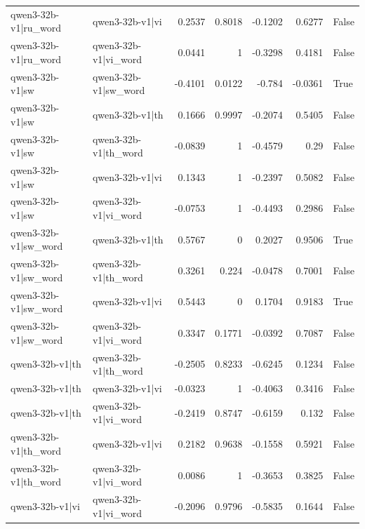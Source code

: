 \begin{table}
\begin{tabular}{l l r r r r l}
qwen3-32b-v1|ru_word & qwen3-32b-v1|vi & 0.2537 & 0.8018 & -0.1202 & 0.6277 & False \\
qwen3-32b-v1|ru_word & qwen3-32b-v1|vi_word & 0.0441 & 1 & -0.3298 & 0.4181 & False \\
qwen3-32b-v1|sw & qwen3-32b-v1|sw_word & -0.4101 & 0.0122 & -0.784 & -0.0361 & True \\
qwen3-32b-v1|sw & qwen3-32b-v1|th & 0.1666 & 0.9997 & -0.2074 & 0.5405 & False \\
qwen3-32b-v1|sw & qwen3-32b-v1|th_word & -0.0839 & 1 & -0.4579 & 0.29 & False \\
qwen3-32b-v1|sw & qwen3-32b-v1|vi & 0.1343 & 1 & -0.2397 & 0.5082 & False \\
qwen3-32b-v1|sw & qwen3-32b-v1|vi_word & -0.0753 & 1 & -0.4493 & 0.2986 & False \\
qwen3-32b-v1|sw_word & qwen3-32b-v1|th & 0.5767 & 0 & 0.2027 & 0.9506 & True \\
qwen3-32b-v1|sw_word & qwen3-32b-v1|th_word & 0.3261 & 0.224 & -0.0478 & 0.7001 & False \\
qwen3-32b-v1|sw_word & qwen3-32b-v1|vi & 0.5443 & 0 & 0.1704 & 0.9183 & True \\
qwen3-32b-v1|sw_word & qwen3-32b-v1|vi_word & 0.3347 & 0.1771 & -0.0392 & 0.7087 & False \\
qwen3-32b-v1|th & qwen3-32b-v1|th_word & -0.2505 & 0.8233 & -0.6245 & 0.1234 & False \\
qwen3-32b-v1|th & qwen3-32b-v1|vi & -0.0323 & 1 & -0.4063 & 0.3416 & False \\
qwen3-32b-v1|th & qwen3-32b-v1|vi_word & -0.2419 & 0.8747 & -0.6159 & 0.132 & False \\
qwen3-32b-v1|th_word & qwen3-32b-v1|vi & 0.2182 & 0.9638 & -0.1558 & 0.5921 & False \\
qwen3-32b-v1|th_word & qwen3-32b-v1|vi_word & 0.0086 & 1 & -0.3653 & 0.3825 & False \\
qwen3-32b-v1|vi & qwen3-32b-v1|vi_word & -0.2096 & 0.9796 & -0.5835 & 0.1644 & False \\
\bottomrule
\end{tabular}
\end{table}

